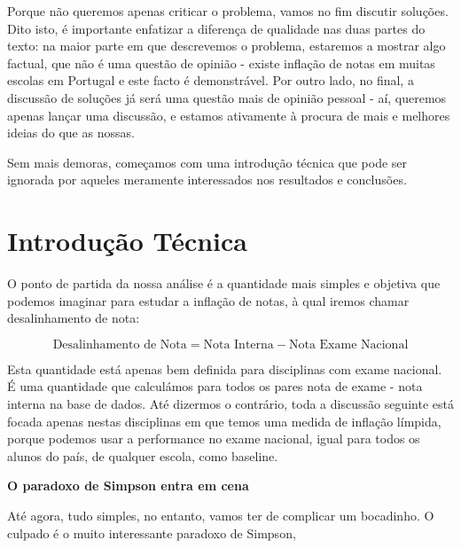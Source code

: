 \documentclass{article}
\begin{document}
Porque não queremos apenas criticar o problema, vamos no fim discutir soluções. Dito isto, é importante enfatizar a diferença de qualidade nas duas partes do texto: na maior parte em que descrevemos o problema, estaremos a mostrar algo factual, que não é uma questão de opinião - existe inflação de notas em muitas escolas em Portugal e este facto é demonstrável. Por outro lado, no final, a discussão de soluções já será uma questão mais de opinião pessoal - aí, queremos apenas lançar uma discussão, e estamos ativamente à procura de mais e melhores ideias do que as nossas. 

Sem mais demoras, começamos com uma introdução técnica que pode ser ignorada por aqueles meramente interessados nos resultados e conclusões. 

\section{Introdução Técnica}

O ponto de partida da nossa análise é a quantidade mais simples e objetiva que podemos imaginar para estudar a inflação de notas, à qual iremos chamar desalinhamento de nota:

\[
\text{Desalinhamento de Nota} = \text{Nota Interna} - \text{Nota Exame Nacional}
\]  

Esta quantidade está apenas bem definida para disciplinas com exame nacional. É uma quantidade que calculámos para todos os pares nota de exame - nota interna na base de dados. Até dizermos o contrário, toda a discussão seguinte está focada apenas nestas disciplinas em que temos uma medida de inflação límpida, porque podemos usar a performance no exame nacional, igual para todos os alunos do país, de qualquer escola, como baseline. 

\textbf{O paradoxo de Simpson entra em cena}

Até agora, tudo simples, no entanto, vamos ter de complicar um bocadinho. O culpado é o muito interessante paradoxo de Simpson, 
\end{document}
